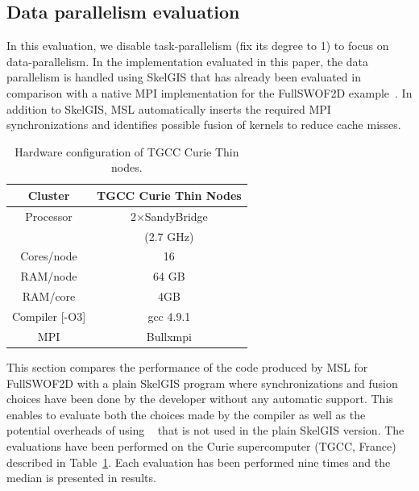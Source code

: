 \subsection{Data parallelism evaluation}

In this evaluation, we disable task-parallelism (fix its degree to 1) to focus on data-parallelism.
In the implementation evaluated in this paper, the data parallelism is handled using SkelGIS that has already been evaluated in comparison with a native MPI implementation for the FullSWOF2D example~\cite{CPE:CPE3494}.
In addition to SkelGIS, MSL automatically inserts the required MPI synchronizations and identifies possible fusion of kernels to reduce cache misses.

\begin{table}[!ht]
\begin{center}
 \begin{tabular}{|c|c|}
    Cluster & \textbf{TGCC Curie Thin Nodes}\\
     \hline         
    Processor & 2$\times$SandyBridge\\
    & (2.7 GHz)\\
    Cores/node & 16 \\
    RAM/node & 64 GB\\
    RAM/core & 4GB\\
    Compiler [-O3] & gcc 4.9.1\\
    MPI & Bullxmpi\\
 \end{tabular}
 \caption{\label{tab:TGCC}Hardware configuration of TGCC Curie Thin nodes.}
 \end{center}
\end{table}

This section compares the performance of the code produced by MSL for FullSWOF2D with a plain SkelGIS program where synchronizations and fusion choices have been done by the developer without any automatic support.
This enables to evaluate both the choices made by the compiler as well as the potential overheads of using \llc~\cite{l2c} that is not used in the plain SkelGIS version.
The evaluations have been performed on the Curie supercomputer (TGCC, France) described in Table~\ref{tab:TGCC}.
Each evaluation has been performed nine times and the median is presented in results.


